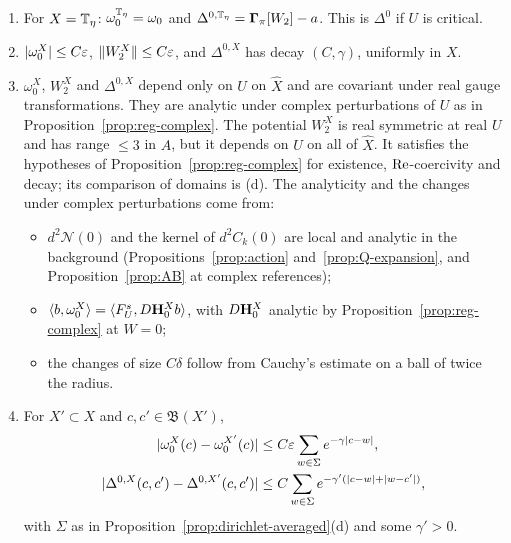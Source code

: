 \begin{proposition}\label{prop:dirichlet-hessian}
\begin{enumerate}[label=(\alph*)]
\item For $X=\mathbb T_\eta$: $\omega_0^{\mathbb T_\eta}=\omega_0$ and $\Delta^{0,\mathbb T_\eta}=\boldsymbol\Gamma_\pi[W_2]-a$. This is $\Delta^0$ if $U$ is critical.
\item $|\omega_0^X|\le C\varepsilon$, $\|W_2^X\|\le C\varepsilon$, and $\Delta^{0,X}$ has decay $(C,\gamma)$, uniformly in $X$.
\item $\omega_0^X$, $W_2^X$ and $\Delta^{0,X}$ depend only on $U$ on $\hat X$ and are covariant under real gauge transformations. They are analytic under complex perturbations of $U$ as in Proposition~\ref{prop:reg-complex}. The potential $W_2^X$ is real symmetric at real $U$ and has range $\le3$ in $A$, but it depends on $U$ on all of $\hat X$. It satisfies the hypotheses of Proposition~\ref{prop:reg-complex} for existence, $\operatorname{Re}$-coercivity and decay; its comparison of domains is (d). The analyticity and the changes under complex perturbations come from:
  \begin{itemize}
  \item $d^2\mathcal N(0)$ and the kernel of $d^2C_k(0)$ are local and analytic in the background (Propositions~\ref{prop:action} and~\ref{prop:Q-expansion}, and Proposition~\ref{prop:AB} at complex references);
  \item $\langle b,\omega^X_0\rangle=\langle F^s_U,D\mathbf H^X_0b\rangle$, with $D\mathbf H^X_0$ analytic by Proposition~\ref{prop:reg-complex} at $W=0$;
  \item the changes of size $C\delta$ follow from Cauchy's estimate on a ball of twice the radius.
  \end{itemize}
\item For $X'\subset X$ and $c,c'\in\mathfrak B(X')$,
\[
\begin{aligned}
|\omega_0^X(c)-\omega_0^{X'}(c)|&\le C\varepsilon\sum_{w\in\Sigma}e^{-\gamma|c-w|},\\
|\Delta^{0,X}(c,c')-\Delta^{0,X'}(c,c')|&\le C\sum_{w\in\Sigma}e^{-\gamma'(|c-w|+|w-c'|)},
\end{aligned}
\]
with $\Sigma$ as in Proposition~\ref{prop:dirichlet-averaged}(d) and some $\gamma'>0$.
\end{enumerate}
\end{proposition}

